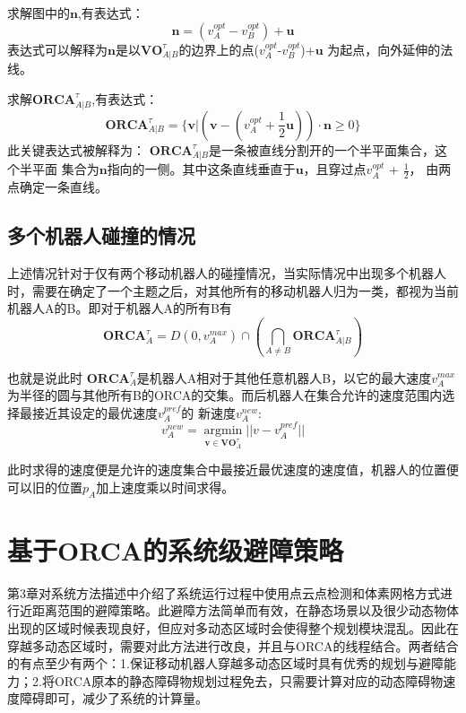 求解图中的$\symbf{n}$,有表达式：
\begin{equation}
    \symbf{n} = (v_A^{opt}-v_B^{opt}) + \symbf{u}
\end{equation}
表达式可以解释为$\symbf{n}$是以$\symbf{VO}^\tau_{A|B}$的边界上的点($v_A^{opt}$-$v_B^{opt}$)+$\symbf{u}$
为起点，向外延伸的法线。


求解$\symbf{ORCA}^\tau_{A|B}$,有表达式：
\begin{equation}
    \symbf{ORCA}^\tau_{A|B} = \{\symbf{v} | (\symbf{v}-(v_A^{opt} + \frac{1}{2}\symbf{u}))\cdot\symbf{n} \geq 0\}
\end{equation}
此关键表达式被解释为： $\symbf{ORCA}^\tau_{A|B}$是一条被直线分割开的一个半平面集合，这个半平面
集合为$\symbf{n}$指向的一侧。其中这条直线垂直于$\symbf{u}$，且穿过点$v_A^{opt}$ + $\frac{1}{2}$，
由两点确定一条直线。






\subsection{多个机器人碰撞的情况}

上述情况针对于仅有两个移动机器人的碰撞情况，当实际情况中出现多个机器人时，需要在确定了一个主题之后，对其他所有的移动机器人归为一类，都视为当前机器人A的B。即对于机器人A的所有B有
\begin{equation}
    \symbf{ORCA}^\tau_A = D(0, v_A^{max}) \cap (\mathop{\bigcap }\limits_{A \neq B}\symbf{ORCA}^\tau_{A|B})
\end{equation}

也就是说此时 $\symbf{ORCA}^\tau_A$是机器人A相对于其他任意机器人B，以它的最大速度$v_A^{max}$为半径的圆与其他所有B的ORCA的交集。而后机器人在集合允许的速度范围内选择最接近其设定的最优速度$v_A^{pref}$的
新速度$v_A^{new}$:
\begin{equation}
    v_A^{new} = \mathop{\arg\min}\limits_{\symbf{v} \in \symbf{VO}^\tau_A}||v- v_A^{pref}||
\end{equation}

此时求得的速度便是允许的速度集合中最接近最优速度的速度值，机器人的位置便可以旧的位置$p_A$加上速度乘以时间求得。


\section{基于ORCA的系统级避障策略}
第3章对系统方法描述中介绍了系统运行过程中使用点云点检测和体素网格方式进行近距离范围的避障策略。此避障方法简单而有效，在静态场景以及很少动态物体出现的区域时候表现良好，但应对多动态区域时会使得整个规划模块混乱。因此在穿越多动态区域时，需要对此方法进行改良，并且与ORCA的线程结合。两者结合的有点至少有两个：1.保证移动机器人穿越多动态区域时具有优秀的规划与避障能力；2.将ORCA原本的静态障碍物规划过程免去，只需要计算对应的动态障碍物速度障碍即可，减少了系统的计算量。

